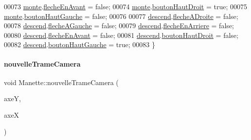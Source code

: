 \begin{DoxyCode}
00073     \hyperlink{class_manette_a63d9a39ea238e105d7491b87f0a3f87d}{monte}.\hyperlink{struct_etat_manette_pilotage_a12429b457b51cb45cc9d405f3a01bea6}{flecheEnAvant} = \textcolor{keyword}{false};
00074     \hyperlink{class_manette_a63d9a39ea238e105d7491b87f0a3f87d}{monte}.\hyperlink{struct_etat_manette_pilotage_ae0ca75dab8c31fe26d440ec319e2fa84}{boutonHautDroit} = \textcolor{keyword}{true};
00075     \hyperlink{class_manette_a63d9a39ea238e105d7491b87f0a3f87d}{monte}.\hyperlink{struct_etat_manette_pilotage_aef8579e406e8766c1936db6da460492a}{boutonHautGauche} = \textcolor{keyword}{false};
00076 
00077     \hyperlink{class_manette_a95e7f41f1e15f01d7530062801817304}{descend}.\hyperlink{struct_etat_manette_pilotage_a78a791f6f8968042efd8e2f64f70f882}{flecheADroite} = \textcolor{keyword}{false};
00078     \hyperlink{class_manette_a95e7f41f1e15f01d7530062801817304}{descend}.\hyperlink{struct_etat_manette_pilotage_aace02b9bb3feb3b618dd9133d4c5b87f}{flecheAGauche} = \textcolor{keyword}{false};
00079     \hyperlink{class_manette_a95e7f41f1e15f01d7530062801817304}{descend}.\hyperlink{struct_etat_manette_pilotage_ab7cce4480358d2e7ac189e96ab04b894}{flecheEnArriere} = \textcolor{keyword}{false};
00080     \hyperlink{class_manette_a95e7f41f1e15f01d7530062801817304}{descend}.\hyperlink{struct_etat_manette_pilotage_a12429b457b51cb45cc9d405f3a01bea6}{flecheEnAvant} = \textcolor{keyword}{false};
00081     \hyperlink{class_manette_a95e7f41f1e15f01d7530062801817304}{descend}.\hyperlink{struct_etat_manette_pilotage_ae0ca75dab8c31fe26d440ec319e2fa84}{boutonHautDroit} = \textcolor{keyword}{false};
00082     \hyperlink{class_manette_a95e7f41f1e15f01d7530062801817304}{descend}.\hyperlink{struct_etat_manette_pilotage_aef8579e406e8766c1936db6da460492a}{boutonHautGauche} = \textcolor{keyword}{true};
00083 \}
\end{DoxyCode}
\mbox{\label{class_manette_a229a449e851b5f716778d19c5cf2ba49}} 
\paragraph{\texorpdfstring{nouvelle\+Trame\+Camera}{nouvelleTrameCamera}}
{\footnotesize\ttfamily void Manette\+::nouvelle\+Trame\+Camera (\begin{DoxyParamCaption}\item[{Q\+String}]{axeY,  }\item[{Q\+String}]{axeX }\end{DoxyParamCaption})\hspace{0.3cm}{\ttfamily [signal]}}



